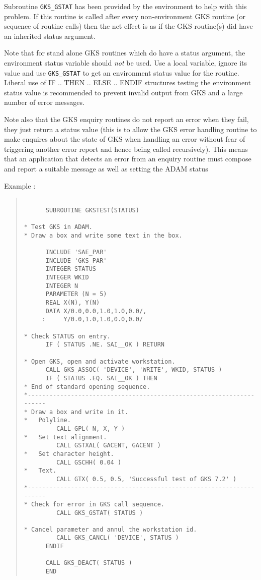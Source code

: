 Subroutine {\tt GKS\_GSTAT} has been provided by the environment to help 
with this problem.
If this routine is called after every non-environment GKS routine
(or sequence of routine calls) then the
net effect is as if the GKS routine(s) did have an inherited status argument.

Note that for stand alone GKS routines which do have a status argument, the
environment status variable should {\em not} be used. Use a local variable,
ignore its value and use {\tt GKS\_GSTAT} to get an environment status value 
for the
routine. Liberal use of IF .. THEN .. ELSE .. ENDIF structures testing the
environment status value is recommended to prevent invalid output from GKS and
a large number of error messages.

Note also that the GKS enquiry routines do not report an error when they fail,
they just return a status value (this is to allow the GKS error handling
routine to make enquires about the state of GKS when handling an error without
fear of triggering another error report and hence being called recursively).
This means that an application that detects an error from an enquiry routine
must compose and report a suitable message as well as setting the ADAM status

Example :\nopagebreak
\begin{quote}
\begin{verbatim}

      SUBROUTINE GKSTEST(STATUS)

* Test GKS in ADAM.
* Draw a box and write some text in the box.

      INCLUDE 'SAE_PAR'
      INCLUDE 'GKS_PAR'
      INTEGER STATUS
      INTEGER WKID
      INTEGER N
      PARAMETER (N = 5)
      REAL X(N), Y(N)
      DATA X/0.0,0.0,1.0,1.0,0.0/,
     :     Y/0.0,1.0,1.0,0.0,0.0/

* Check STATUS on entry.
      IF ( STATUS .NE. SAI__OK ) RETURN

* Open GKS, open and activate workstation.
      CALL GKS_ASSOC( 'DEVICE', 'WRITE', WKID, STATUS )
      IF ( STATUS .EQ. SAI__OK ) THEN
* End of standard opening sequence.
*---------------------------------------------------------------------
* Draw a box and write in it.
*   Polyline.
         CALL GPL( N, X, Y )
*   Set text alignment.
         CALL GSTXAL( GACENT, GACENT )
*   Set character height.
         CALL GSCHH( 0.04 )
*   Text.
         CALL GTX( 0.5, 0.5, 'Successful test of GKS 7.2' )
*---------------------------------------------------------------------
* Check for error in GKS call sequence.
         CALL GKS_GSTAT( STATUS )

* Cancel parameter and annul the workstation id.
         CALL GKS_CANCL( 'DEVICE', STATUS )
      ENDIF

      CALL GKS_DEACT( STATUS )
      END
\end{verbatim}
\end{quote}


